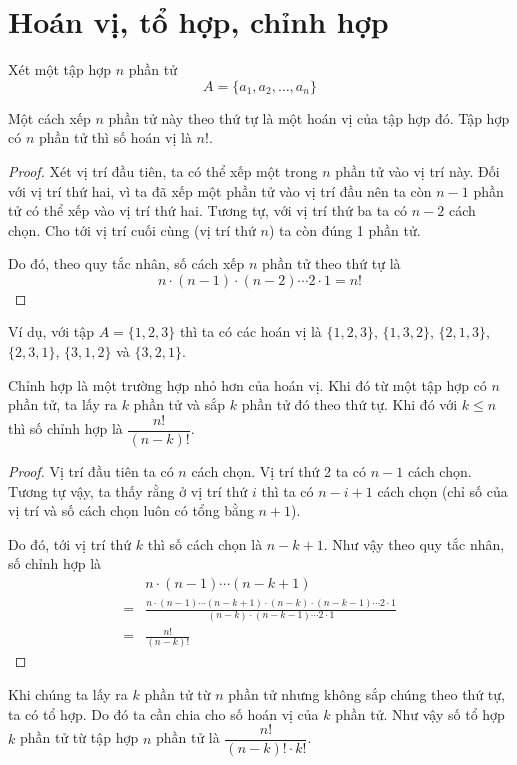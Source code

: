 \section{Hoán vị, tổ hợp, chỉnh hợp}

Xét một tập hợp $n$ phần tử
\[A = \{a_1, a_2, \ldots, a_n\}\]

Một cách xếp $n$ phần tử này theo thứ tự là một hoán vị của tập
hợp đó. Tập hợp có $n$ phần tử thì số hoán vị là $n!$.

\begin{proof}
    Xét vị trí đầu tiên, ta có thể xếp một trong $n$ phần tử
    vào vị trí này. Đối với vị trí thứ hai, vì ta đã xếp 
    một phần tử vào vị trí đầu nên ta còn $n-1$ phần tử có thể
    xếp vào vị trí thứ hai. Tương tự, với vị trí thứ ba ta có
    $n-2$ cách chọn. Cho tới vị trí cuối cùng (vị trí thứ $n$)
    ta còn đúng 1 phần tử.

    Do đó, theo quy tắc nhân, số cách xếp $n$ phần tử theo thứ
    tự là \[n \cdot (n-1) \cdot (n-2) \cdots 2 \cdot 1 = n!\]
\end{proof}

Ví dụ, với tập $A = \{1, 2, 3\}$ thì ta có các hoán vị là 
$\{1, 2, 3\}$, $\{1, 3, 2\}$, $\{2, 1, 3\}$, $\{2, 3, 1\}$,
$\{3, 1, 2\}$ và $\{3, 2, 1\}$.

Chỉnh hợp là một trường hợp nhỏ hơn của hoán vị. Khi đó từ
một tập hợp có $n$ phần tử, ta lấy ra $k$ phần tử và sắp 
$k$ phần tử đó theo thứ tự. Khi đó với $k \leq n$ thì số
chỉnh hợp là $\dfrac{n!}{(n-k)!}$.

\begin{proof}
    Vị trí đầu tiên ta có $n$ cách chọn. Vị trí thứ 2 ta có
    $n-1$ cách chọn. Tương tự vậy, ta thấy rằng ở vị trí
    thứ $i$ thì ta có $n-i+1$ cách chọn (chỉ số của vị trí
    và số cách chọn luôn có tổng bằng $n+1$).

    Do đó, tới vị trí thứ $k$ thì số cách chọn là $n-k+1$.
    Như vậy theo quy tắc nhân, số chỉnh hợp là
    \begin{equation}
        \begin{split}
            & n \cdot (n-1) \cdots (n-k+1) \\ = & \frac{
         n \cdot (n-1) \cdots (n-k+1) \cdot (n-k) \cdot (n-k-1) 
         \cdots 2 \cdot 1}
        {(n-k) \cdot (n-k-1) \cdots 2 \cdot 1} \\ 
        = & \frac{n!}{(n-k)!}
        \end{split}
    \end{equation}
\end{proof}

Khi chúng ta lấy ra $k$ phần tử từ $n$ phần tử nhưng không
sắp chúng theo thứ tự, ta có tổ hợp. Do đó ta cần chia cho
số hoán vị của $k$ phần tử. Như vậy số tổ hợp $k$ phần tử
từ tập hợp $n$ phần tử là $\dfrac{n!}{(n-k)! \cdot k!}$.
